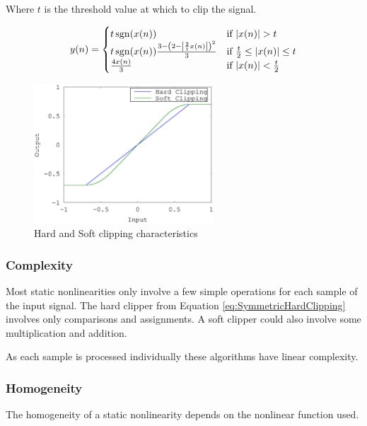 		Where $t$ is the threshold value at which to clip the signal.

		\begin{equation}
			y(n) = \begin{cases}
				t\operatorname{sgn}(x(n)) & \text{if $|x(n)| > t$} \\
				t\operatorname{sgn}(x(n))\frac{3 - \left(2 - \left|\frac{2}{t}x(n) \right| \right)^{2}}{3} & \text{if
					$\frac{t}{2} \leq |x(n)| \leq t$} \\
				\frac{4x(n)}{3} & \text{if $|x(n)| < \frac{t}{2}$}
			\end{cases}
			\label{eq:SymmetricSoftClipping}
		\end{equation}

		\begin{figure}[h!]
			\centering
			\includegraphics[width=0.6\textwidth]{chapter3/Images/Clipping.eps}
			\caption{Hard and Soft clipping characteristics}
			\label{fig:Clipping}
		\end{figure}

		\subsubsection*{Complexity}
			Most static nonlinearities only involve a few simple operations for each sample of the input
			signal. The hard clipper from Equation \ref{eq:SymmetricHardClipping} involves only comparisons and
			assignments. A soft clipper  could also involve some multiplication and
			addition.
			
			As each sample is processed individually these algorithms have linear complexity.

		\subsubsection*{Homogeneity}
			The homogeneity of a static nonlinearity depends on the nonlinear function used. 

